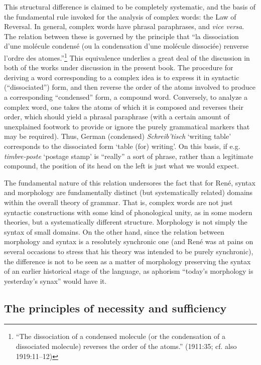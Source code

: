 \documentclass[output=paper]{langsci/langscibook}
\begin{document}
This structural difference is claimed to be completely systematic, and
the basis of the fundamental rule invoked for the analysis of complex
words: the Law of Reversal.  In general, complex words have phrasal
paraphrases, and \emph{vice versa}. The relation between these is
governed by the principle that ``la dissociation d'une molécule
condensé (ou la condensation d'une molécule dissociée) renverse
l'ordre des atomes.''\footnote{``The dissociation of a condensed
  molecule (or the condensation of a dissociated molecule) reverses
  the order of the atoms.'' (1911:35; cf. also 1919:11--12)} This
equivalence underlies a great deal of the discussion in both of the
works under discussion in the present book. The procedure for deriving
a word corresponding to a complex idea is to express it in syntactic
(``dissociated'') form, and then reverse the order of the atoms
involved to produce a corresponding ``condensed'' form, a compound
word.  Conversely, to analyze a complex word, one takes the atoms of
which it is composed and reverses their order, which should yield a
phrasal paraphrase (with a certain amount of unexplained footwork to
provide or ignore the purely grammatical markers that may be
required). Thus, German (condensed) \emph{Schreib'tisch} `writing
table' corresponds to the dissociated form `table (for) writing'.  On
this basis, if e.g. \emph{timbre-poste} `postage stamp' is ``really'' a
sort of phrase, rather than a legitimate compound, the position of its
head on the left is just what we would expect.

The fundamental nature of this relation undersores the fact that for
René, syntax and morphology are fundamentally distinct (but
systematically related) domains within the overall theory of grammar.
That is, complex words are not just syntactic constructions with some
kind of phonological unity, as in some modern theories, but a
systematically different structure.  Morphology is not simply the
syntax of small domains.  On the other hand, since the relation
between morphology and syntax is a resolutely synchronic one (and René
was at pains on several occasions to stress that his theory was
intended to be purely synchronic), the difference is not to be seen as
a matter of morphology preserving the syntax of an earlier historical
stage of the language, as  aphorism
``today's morphology is yesterday's synax'' would have it.

\subsection{The principles of necessity and sufficiency}
\label{sec:necess-sufficient}
\end{document}
